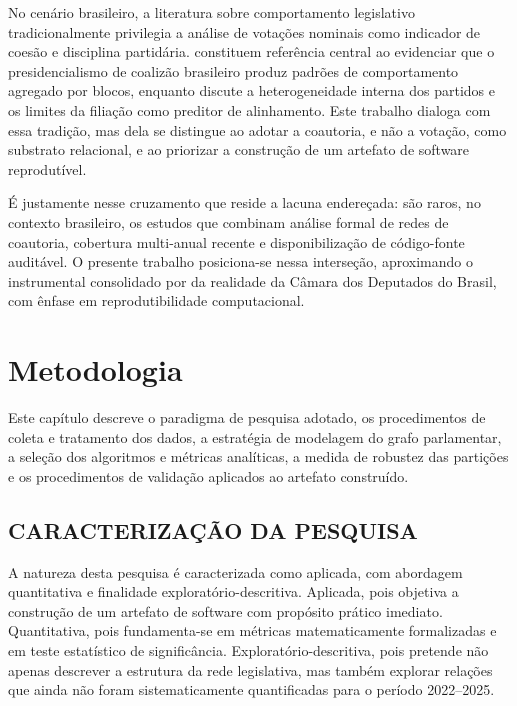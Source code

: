 \documentclass[
      12pt,
      a4paper,
      openright,
      oneside,
      chapter=TITLE,
      section=TITLE,
      english,
      french,
      spanish,
      brazilian
    ]{abntex2}
\begin{document}
    No cenário brasileiro, a literatura sobre comportamento legislativo tradicionalmente privilegia a análise de votações nominais como indicador de coesão e disciplina partidária.  constituem referência central ao evidenciar que o presidencialismo de coalizão brasileiro produz padrões de comportamento agregado por blocos, enquanto  discute a heterogeneidade interna dos partidos e os limites da filiação como preditor de alinhamento. Este trabalho dialoga com essa tradição, mas dela se distingue ao adotar a coautoria, e não a votação, como substrato relacional, e ao priorizar a construção de um artefato de software reprodutível.
    
    É justamente nesse cruzamento que reside a lacuna endereçada: são raros, no contexto brasileiro, os estudos que combinam análise formal de redes de coautoria, cobertura multi-anual recente e disponibilização de código-fonte auditável. O presente trabalho posiciona-se nessa interseção, aproximando o instrumental consolidado por  da realidade da Câmara dos Deputados do Brasil, com ênfase em reprodutibilidade computacional.
    
    \chapter{Metodologia}
    \label{cap:metodologia}
    
    Este capítulo descreve o paradigma de pesquisa adotado, os procedimentos de coleta e
    tratamento dos dados, a estratégia de modelagem do grafo parlamentar, a seleção dos algoritmos
    e métricas analíticas, a medida de robustez das partições e os procedimentos de
    validação aplicados ao artefato construído.
    
    \section{CARACTERIZAÇÃO DA PESQUISA}
    
    A natureza desta pesquisa é caracterizada como aplicada, com abordagem quantitativa e finalidade exploratório-descritiva. Aplicada, pois objetiva a construção de um artefato de software com propósito prático imediato. Quantitativa, pois fundamenta-se em métricas matematicamente formalizadas e em teste estatístico de significância. Exploratório-descritiva, pois pretende não apenas descrever a estrutura da rede legislativa, mas também explorar relações que ainda não foram sistematicamente quantificadas para o período 2022--2025.
    
\end{document}
